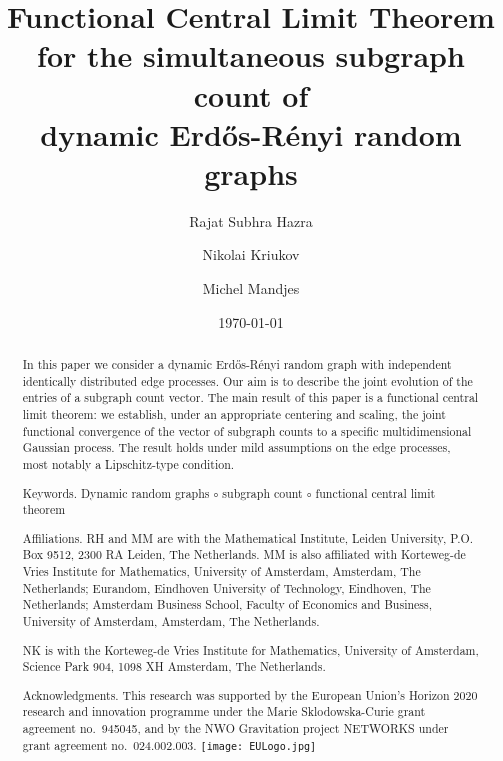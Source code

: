 \documentclass[11pt,reqno]{amsart}
\numberwithin{equation}{section}
\begin{document}
\title[Subgraph count of dynamic ER random graphs]{Functional Central Limit Theorem \\for the simultaneous subgraph count of\\ dynamic Erd\H{o}s-R\'enyi random graphs}
\author{Rajat Subhra Hazra}
\author{Nikolai Kriukov}
\author{Michel Mandjes}

\date{\today}

\maketitle

\begin{abstract}
   In this paper we consider a dynamic Erd\H{o}s-R\'{e}nyi random graph with independent identically distributed edge processes. Our aim is to describe the joint evolution of the entries of a subgraph count vector. The main result of this paper is a functional central limit theorem: we establish, under an appropriate centering and scaling, the joint functional convergence of the vector of subgraph counts to a specific multidimensional Gaussian process. The result holds under mild assumptions on the edge processes, most notably a Lipschitz-type condition.

    

    \vspace{3mm}

    \noindent
{\sc Keywords.} Dynamic random graphs $\circ$ subgraph count $\circ$ functional central limit theorem

\vspace{3mm}


\noindent
{\sc Affiliations.} RH and MM are with the Mathematical Institute, Leiden University, P.O. Box 9512,
2300 RA Leiden,
The Netherlands. MM is also affiliated with Korteweg-de Vries Institute for Mathematics, University of Amsterdam, Amsterdam, The Netherlands; E{\sc urandom}, Eindhoven University of Technology, Eindhoven, The Netherlands; Amsterdam Business School, Faculty of Economics and Business, University of Amsterdam, Amsterdam, The Netherlands. 


\noindent
NK is with the Korteweg-de Vries Institute for Mathematics, University of Amsterdam, Science Park 904, 1098 XH Amsterdam, The Netherlands.

\vspace{3mm}

\noindent
{\sc Acknowledgments.} 
This research was supported by the European Union’s Horizon 2020 research and innovation programme under the Marie Sklodowska-Curie grant agreement no.\ 945045, and by the NWO Gravitation project NETWORKS under grant agreement no.\ 024.002.003. \texttt{[image: EULogo.jpg]} 

\end{abstract}
\end{document}
